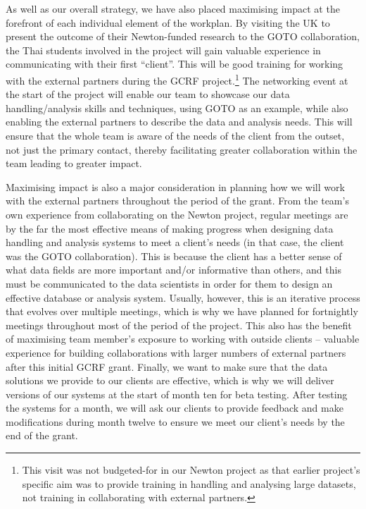 \documentclass[11pt]{article}
\begin{document}
  \vspace{2mm}
  \noindent
  As well as our overall strategy, we have also placed maximising impact at the forefront of each individual element of the workplan. By visiting the UK to present the outcome of their Newton-funded research to the GOTO collaboration, the Thai students involved in the project will gain valuable experience in communicating with their first ``client''. This will be good training for working with the external partners during the GCRF project.\footnote{This visit was not budgeted-for in our Newton project as that earlier project's specific aim was to provide training in handling and analysing large datasets, not training in collaborating with external partners.} The networking event at the start of the project will enable our team to showcase our data handling/analysis skills and techniques, using GOTO as an example, while also enabling the external partners to describe the data and analysis needs. This will ensure that the whole team is aware of the needs of the client from the outset, not just the primary contact, thereby facilitating greater collaboration within the team leading to greater impact.
  
  \vspace{2mm}
  \noindent
  Maximising impact is also a major consideration in planning how we will work with the external partners throughout the period of the grant. From the team's own experience from collaborating on the Newton project, regular meetings are by the far the most effective means of making progress when designing data handling and analysis systems to meet a client's needs (in that case, the client was the GOTO collaboration). This is because the client has a better sense of what data fields are more important and/or informative than others, and this must be communicated to the data scientists in order for them to design an effective database or analysis system. Usually, however, this is an iterative process that evolves over multiple meetings, which is why we have planned for fortnightly meetings throughout most of the period of the project. This also has the benefit of maximising team member's exposure to working with outside clients -- valuable experience for building collaborations with larger numbers of external partners after this initial GCRF grant. Finally, we want to make sure that the data solutions we provide to our clients are effective, which is why we will deliver versions of our systems at the start of month ten for beta testing. After testing the systems for a month, we will ask our clients to provide feedback and make modifications during month twelve to ensure we meet our client's needs by the end of the grant. 
  
\end{document}
